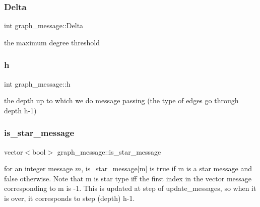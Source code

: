 \subsubsection{\texorpdfstring{Delta}{Delta}}
{\footnotesize\ttfamily int graph\+\_\+message\+::\+Delta\hspace{0.3cm}{\ttfamily [private]}}



the maximum degree threshold 

\mbox{\label{classgraph__message_a934d63ed7275c211e13c6fb68824ed46}} 
\subsubsection{\texorpdfstring{h}{h}}
{\footnotesize\ttfamily int graph\+\_\+message\+::h\hspace{0.3cm}{\ttfamily [private]}}



the depth up to which we do message passing (the type of edges go through depth h-\/1) 

\mbox{\label{classgraph__message_a55ff5531a0043106369e84a7bc45e22d}} 
\subsubsection{\texorpdfstring{is\+\_\+star\+\_\+message}{is\_star\_message}}
{\footnotesize\ttfamily vector$<$bool$>$ graph\+\_\+message\+::is\+\_\+star\+\_\+message}



for an integer message $m$, is\+\_\+star\+\_\+message\mbox{[}m\mbox{]} is true if m is a star message and false otherwise. Note that m is star type iff the first index in the vector message corresponding to m is -\/1. This is updated at step of update\+\_\+messages, so when it is over, it corresponds to step (depth) h-\/1. 

\mbox{\label{classgraph__message_a557473b726dc5d80618055a6b843670f}} 
